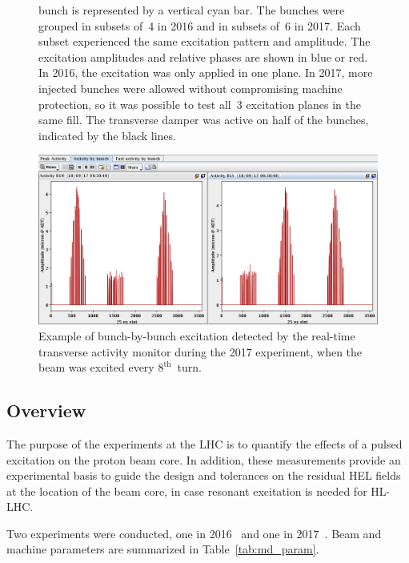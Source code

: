 \documentclass[%
 reprint,
 amsmath,amssymb,
 aps,
prstab,
longbibliography
]{revtex4-1}
\begin{document}
\begin{figure}
{    bunch is represented by a vertical cyan bar. The bunches were
    grouped in subsets of~4 in 2016 and in subsets of~6 in 2017. Each
    subset experienced the same excitation pattern and amplitude. The
    excitation amplitudes and relative phases are shown in blue or
    red. In 2016, the excitation was only applied in one plane. In
    2017, more injected bunches were allowed without compromising
    machine protection, so it was possible to test all~3 excitation
    planes in the same fill. The transverse damper was active on half
    of the bunches, indicated by the black lines.}
  \label{fig:fill}
\end{figure}

\begin{figure}
  \includegraphics[width=\textwidth]{bunchfilling_measured.png}	
  \caption{Example of bunch-by-bunch excitation detected by the
    real-time transverse activity monitor during the 2017 experiment,
    when the beam was excited every $8^\mathrm{th}$~turn.}
  \label{fig:fill_meas} 
\end{figure}

\subsection{Overview}
\label{sec:exp_sum}

The purpose of the experiments at the LHC is to quantify the effects
of a pulsed excitation on the proton beam core. In addition, these
measurements provide an experimental basis to guide the design and
tolerances on the residual HEL fields at the location of the beam
core, in case resonant excitation is needed for HL-LHC.

Two experiments were conducted, one in 2016~\cite{resexmd2016} and one
in 2017~\cite{resexmd2017}. Beam and machine parameters are summarized
in Table~\ref{tab:md_param}.
\end{document}
